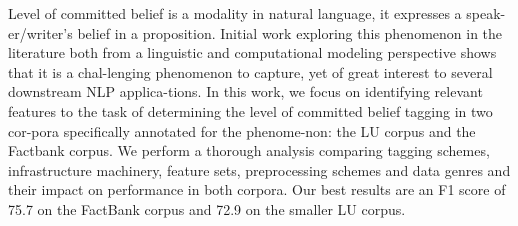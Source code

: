 Level of committed belief is a modality in natural language, it expresses a speak-er/writer's belief in a proposition. Initial work exploring this phenomenon in the literature both from a linguistic and computational modeling perspective shows that it is a chal-lenging phenomenon to capture, yet of great interest to several downstream NLP applica-tions.  In this work, we focus on identifying relevant features to the task of determining the level of committed belief tagging in two cor-pora specifically annotated for the phenome-non: the LU corpus and the Factbank corpus. We perform a thorough analysis comparing tagging schemes, infrastructure machinery, feature sets, preprocessing schemes and data genres and their impact on performance in both corpora. Our best results are an F1 score of 75.7 on the FactBank corpus and 72.9 on the smaller LU corpus.
